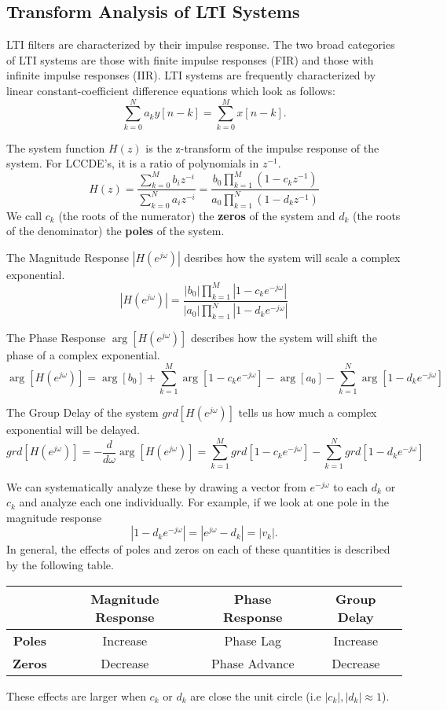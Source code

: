 \subsection{Transform Analysis of LTI Systems}
LTI filters are characterized by their impulse response. The two broad categories of LTI systems are those with finite impulse responses (FIR) and those with infinite impulse responses (IIR).
LTI systems are frequently characterized by linear constant-coefficient difference equations which look as follows:
\[
  \sum_{k=0}^{N}a_ky[n-k] = \sum_{k=0}^Mx[n-k].
\]
\begin{definition}
  The system function $H(z)$ is the z-transform of the impulse response of the system. For LCCDE's, it is a ratio of polynomials in $z^{-1}$.
  \[
	H(z) = \frac{\sum_{k=0}^Mb_iz^{-i}}{\sum_{k=0}^Na_iz^{-i}} = \frac{b_0\prod_{k=1}^M(1-c_kz^{-1})}{a_0\prod_{k=1}^N(1-d_kz^{-1})}
  \]
  We call $c_k$ (the roots of the numerator) the \textbf{zeros} of the system and $d_k$ (the roots of the denominator) the \textbf{poles} of the system.
  \label{defn:system-function}
\end{definition}
\begin{definition}
  The Magnitude Response $|H(e^{j\omega})|$ desribes how the system will scale a complex exponential.
  \[
	|H(e^{j\omega})| = \frac{|b_0|\prod_{k=1}^M|1-c_ke^{-j\omega}|}{|a_0|\prod_{k=1}^N|1-d_ke^{-j\omega}|}
  \]
  \label{defn:magnitude-response}
\end{definition}
\begin{definition}
  The Phase Response $\arg[H(e^{j\omega})]$ describes how the system will shift the phase of a complex exponential.
  \[
	\arg[H(e^{j\omega})] = \arg[b_0]+\sum_{k=1}^{M}\arg[1-c_ke^{-j\omega}] - \arg[a_0] - \sum_{k=1}^{N}\arg[1-d_ke^{-j\omega}]
  \]
  \label{defn:phase-response}
\end{definition}
\begin{definition}
  The Group Delay of the system $grd[H(e^{j\omega})]$ tells us how much a complex exponential will be delayed.
  \[
	grd[H(e^{j\omega})] = -\frac{d}{d\omega}\arg[H(e^{j\omega})] = \sum_{k=1}^{M}grd[1-c_ke^{-j\omega}] - \sum_{k=1}^{N}grd[1-d_ke^{-j\omega}]
  \]
  \label{defn:group-delay}
\end{definition}
We can systematically analyze these by drawing a vector from $e^{-j\omega}$ to each $d_k$ or $c_k$ and analyze each one individually.
For example, if we look at one pole in the magnitude response
\[
  |1-d_ke^{-j\omega}| = |e^{j\omega}-d_k| = |v_k|.
\]
In general, the effects of poles and zeros on each of these quantities is described by the following table.
\begin{center}
  \begin{tabular}{|c|c|c|c|}
    \hline
    & \textbf{Magnitude Response} & \textbf{Phase Response} & \textbf{Group Delay}\\
    \hline
    \textbf{Poles} & Increase & Phase Lag & Increase\\
    \hline
    \textbf{Zeros} & Decrease & Phase Advance & Decrease\\
    \hline
  \end{tabular}
\end{center}
These effects are larger when $c_k$ or $d_k$ are close the unit circle (i.e $|c_k|, |d_k|\approx 1$).
